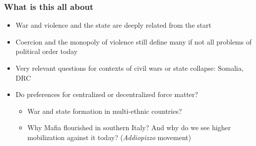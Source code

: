 \documentclass[utf8, xcolor=dvipsnames, handout]{beamer}
\begin{document}
\begin{frame}
\frametitle{What is this all about}
\centering

\begin{itemize}[<+->]
  \item War and violence and the state are deeply related from the start
  \item Coercion and the monopoly of violence still define many if not all problems of political order today
  \item Very relevant questions for contexts of civil wars or state collapse: Somalia, DRC
  \item Do preferences for centralized or decentralized force matter?
  \begin{itemize}[<+->]
    \item War and state formation in multi-ethnic countries?
    \item Why Mafia flourished in southern Italy? And why do we see higher mobilization against it today? (\textit{Addiopizzo} movement)
  \end{itemize}
\end{itemize}

\end{frame}
\end{document}
